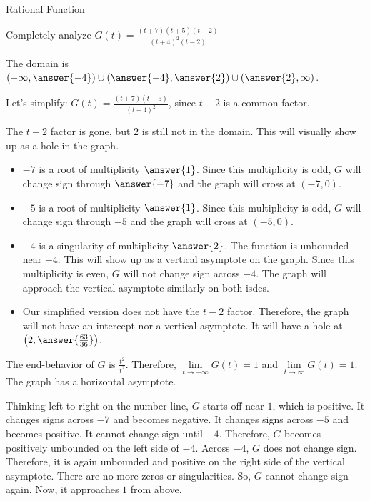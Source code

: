 \documentclass{ximera}
\begin{document}
\begin{example} Rational Function


Completely analyze $G(t) = \frac{(t+7)(t+5)(t-2)}{(t+4)^2(t-2)}$




\begin{explanation}



The domain is $\left( -\infty, \answer{-4} \right) \cup \left(\answer{-4}, \answer{2} \right) \cup \left( \answer{2}, \infty \right)$.

Let's simplify: $G(t) = \frac{(t+7)(t+5)}{(t+4)^2}$, since $t-2$ is a common factor.



The $t-2$ factor is gone, but $2$ is still not in the domain.  This will visually show up as a hole in the graph.



\begin{itemize}
\item $-7$ is a root of multiplicity $\answer{1}$.  Since this multiplicity is odd, $G$ will change sign through $\answer{-7}$ and the graph will cross at $(-7,0)$.
\item $-5$ is a root of multiplicity $\answer{1}$.  Since this multiplicity is odd, $G$ will change sign through $-5$ and the graph will cross at $(-5,0)$.
\item $-4$ is a singularity of multiplicity $\answer{2}$.  The function is unbounded near $-4$.  This will show up as a vertical asymptote on the graph. Since this multiplicity is even, $G$ will not change sign across $-4$.  The graph will approach the vertical asymptote similarly on both isdes.
\item Our simplified version does not have the $t-2$ factor.  Therefore, the graph will not have an intercept nor a vertical asymptote.  It will have a hole at $\left( 2, \answer{\frac{63}{36}} \right)$.
\end{itemize}


The end-behavior of $G$ is $\frac{t^2}{t^2}$.  Therefore, $\lim\limits_{t \to -\infty}G(t) = 1$ and $\lim\limits_{t \to \infty}G(t) = 1$.  The graph has a horizontal asymptote.




Thinking left to right on the number line, $G$ starts off near $1$, which is positive.  It changes signs across $-7$ and becomes negative. It changes signs across $-5$ and becomes positive.  It cannot change sign until $-4$.  Therefore, $G$ becomes positively unbounded on the left side of $-4$.  Across $-4$, $G$ does not change sign.  Therefore, it is again unbounded and positive on the right side of the vertical asymptote.  There are no more zeros or singularities.  So, $G$ cannot change sign again.  Now, it approaches $1$ from above.





\end{explanation}
\end{example}
\end{document}
